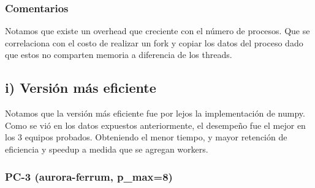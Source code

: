 \documentclass[11pt]{article}
\begin{document}
\subsubsection*{Comentarios}

Notamos que existe un overhead que creciente con el n\'umero de procesos. Que se correlaciona con el costo de realizar un fork y copiar los datos del proceso dado que estos no comparten memoria a diferencia de los threads.

\subsection*{i) Versi\'on m\'as eficiente}

Notamos que la versi\'on m\'as eficiente fue por lejos la implementaci\'on de numpy. Como se vi\'o en los datos expuestos anteriormente, el desempe\~no fue el mejor en los 3 equipos probados. Obteniendo el menor tiempo, y mayor retenci\'on de eficiencia y speedup a medida que se agregan workers.

\subsubsection*{PC-3 (aurora-ferrum, p\_max=8)}
\end{document}
